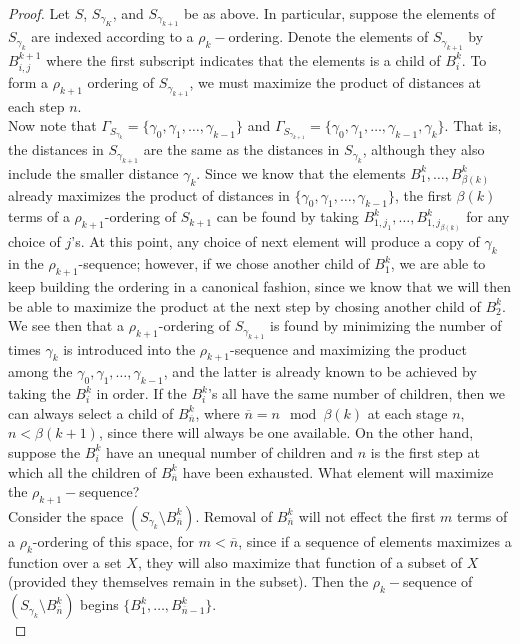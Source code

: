 \begin{proof}
Let $S$, $S_{\gamma_K}$, and $S_{\gamma_{k+1}}$ be as above. In particular, suppose the elements of $S_{\gamma_k}$ are indexed according to a $\rho_k-$ordering. Denote the elements of $S_{\gamma_{k+1}}$ by $B^{k+1}_{i,j}$ where the first subscript indicates that the elements is a child of $B^k_i$. To form a $\rho_{k+1}$ ordering of $S_{\gamma_{k+1}}$, we must maximize the product of distances at each step $n$.\\

Now note that $\Gamma_{S_{\gamma_k}} = \{\gamma_0, \gamma_1,\ldots, \gamma_{k-1}\}$ and $\Gamma_{S_{\gamma_{k+1}}} = \{\gamma_0, \gamma_1,\ldots, \gamma_{k-1}, \gamma_{k}\}$. That is, the distances in $S_{\gamma_{k+1}}$ are the same as the distances in $S_{\gamma_k}$, although they also include the smaller distance $\gamma_k$. Since we know that the elements $B^k_1,\ldots,B^k_{\beta(k)}$ already maximizes the product of distances in $\{\gamma_0, \gamma_1,\ldots, \gamma_{k-1}\}$, the first $\beta(k)$ terms of a $\rho_{k+1}$-ordering of $S_{k+1}$ can be found by taking $B^k_{1,j_1},\ldots, B^k_{1,j_{\beta(k)}}$ for any choice of $j$'s. At this point, any choice of next element will produce a copy of $\gamma_k$ in the $\rho_{k+1}$-sequence; however, if we chose another child of $B^k_{1}$, we are able to keep building the ordering in a canonical fashion, since we know that we will then be able to maximize the product at the next step by chosing another child of $B^k_{2}$.\\

We see then that a $\rho_{k+1}$-ordering of $S_{\gamma_{k+1}}$ is found by minimizing the number of times $\gamma_k$ is introduced into the $\rho_{k+1}$-sequence and maximizing the product among the $\gamma_0, \gamma_1,\ldots, \gamma_{k-1}$, and the latter is already known to be achieved by taking the $B^k_i$ in order.  If the $B^k_i$'s all have the same number of children, then we can always select a child of $B^k_{\overline{n}}$, where $\overline{n} = n \mod \beta(k)$ at each stage $n$, $n < \beta(k+1)$, since there will always be one available. On the other hand, suppose the $B^k_i$ have an unequal number of children and $n$ is the first step at which all the children of $B^k_{\overline{n}}$ have been exhausted. What element will maximize the $\rho_{k+1}-$sequence?\\

Consider the space $(S_{\gamma_k} \setminus B^k_{\overline{n}})$. Removal of $B^k_{\overline{n}}$ will not effect the first $m$ terms of a $\rho_k$-ordering of this space, for $m < \overline{n}$, since if a sequence of elements maximizes a function over a set $X$, they will also maximize that function of a subset of $X$ (provided they themselves remain in the subset). Then the $\rho_k-$sequence of $(S_{\gamma_k} \setminus B^k_{\overline{n}})$ begins $\{B^k_1,\ldots, B^k_{\overline{n}-1}\}$.\\


\end{proof}
